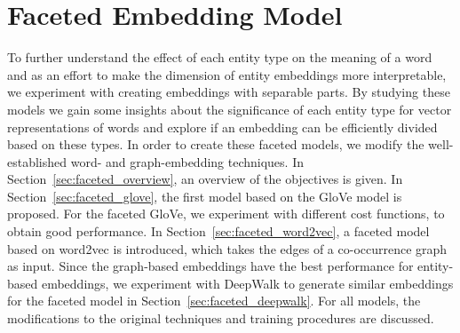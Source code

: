 \chapter{Faceted Embedding Model}\label{chap:faceted}
To further understand the effect of each entity type on the meaning of a word and as an effort to make the dimension of entity embeddings more interpretable, we experiment with creating embeddings with separable parts. By studying these models we gain some insights about the significance of each entity type for vector representations of words and explore if an embedding can be efficiently divided based on these types. In order to create these faceted models, we modify the well-established word- and graph-embedding techniques. In Section~\ref{sec:faceted_overview}, an overview of the objectives is given. In Section~\ref{sec:faceted_glove}, the first model based on the GloVe model is proposed. For the faceted GloVe, we experiment with different cost functions, to obtain good performance. In Section~\ref{sec:faceted_word2vec}, a faceted model based on word2vec is introduced, which takes the edges of a co-occurrence graph as input. Since the graph-based embeddings have the best performance for entity-based embeddings, we experiment with DeepWalk to generate similar embeddings for the faceted model in Section~\ref{sec:faceted_deepwalk}. For all models, the modifications to the original techniques and training procedures are discussed. 

